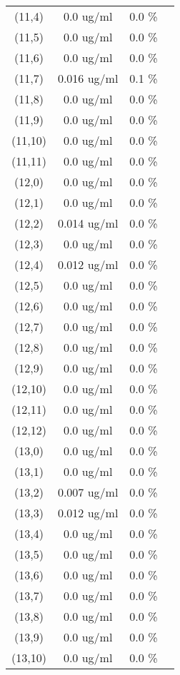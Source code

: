 \documentclass{article}
\begin{document}
\begin{tabular}{c c c c}
(11,4)&        0.0 ug/ml        &0.0 \%\\
(11,5)&        0.0 ug/ml        &0.0 \%\\
(11,6)&        0.0 ug/ml        &0.0 \%\\
(11,7)&        0.016 ug/ml        &0.1 \%\\
(11,8)&        0.0 ug/ml        &0.0 \%\\
(11,9)&        0.0 ug/ml        &0.0 \%\\
(11,10)&        0.0 ug/ml        &0.0 \%\\
(11,11)&        0.0 ug/ml        &0.0 \%\\
(12,0)&        0.0 ug/ml        &0.0 \%\\
(12,1)&        0.0 ug/ml        &0.0 \%\\
(12,2)&        0.014 ug/ml        &0.0 \%\\
(12,3)&        0.0 ug/ml        &0.0 \%\\
(12,4)&        0.012 ug/ml        &0.0 \%\\
(12,5)&        0.0 ug/ml        &0.0 \%\\
(12,6)&        0.0 ug/ml        &0.0 \%\\
(12,7)&        0.0 ug/ml        &0.0 \%\\
(12,8)&        0.0 ug/ml        &0.0 \%\\
(12,9)&        0.0 ug/ml        &0.0 \%\\
(12,10)&        0.0 ug/ml        &0.0 \%\\
(12,11)&        0.0 ug/ml        &0.0 \%\\
(12,12)&        0.0 ug/ml        &0.0 \%\\
(13,0)&        0.0 ug/ml        &0.0 \%\\
(13,1)&        0.0 ug/ml        &0.0 \%\\
(13,2)&        0.007 ug/ml        &0.0 \%\\
(13,3)&        0.012 ug/ml        &0.0 \%\\
(13,4)&        0.0 ug/ml        &0.0 \%\\
(13,5)&        0.0 ug/ml        &0.0 \%\\
(13,6)&        0.0 ug/ml        &0.0 \%\\
(13,7)&        0.0 ug/ml        &0.0 \%\\
(13,8)&        0.0 ug/ml        &0.0 \%\\
(13,9)&        0.0 ug/ml        &0.0 \%\\
(13,10)&        0.0 ug/ml        &0.0 \%\\

\end{tabular}
\end{document}
